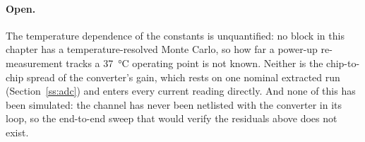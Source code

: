 \paragraph{Open.} The temperature dependence of the constants is unquantified:
no block in this chapter has a temperature-resolved Monte Carlo, so how far a
power-up re-measurement tracks a \SI{37}{\celsius} operating point is not known.
Neither is the chip-to-chip spread of the converter's gain, which rests on one
nominal extracted run (Section~\ref{ss:adc}) and enters every current reading
directly. And none of this has been simulated: the channel has never been
netlisted with the converter in its loop, so the end-to-end sweep that would
verify the residuals above does not exist.
